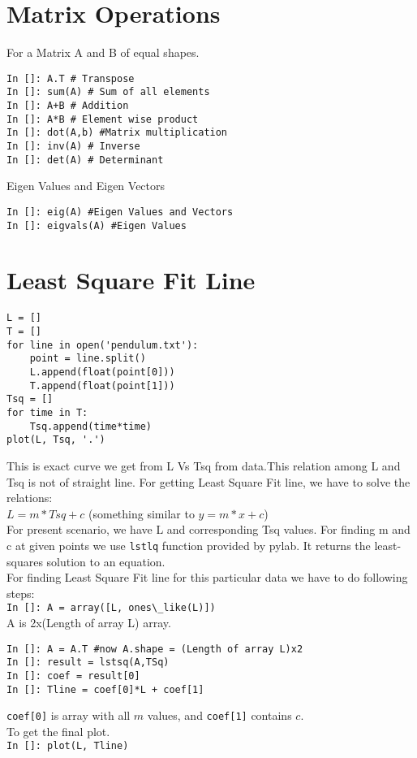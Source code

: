 \documentclass[12pt]{article}
\newcommand{\typ}[1]{\lstinline{#1}}
\begin{document}
\section{Matrix Operations}
For a Matrix A and B of equal shapes.
\begin{lstlisting}
In []: A.T # Transpose
In []: sum(A) # Sum of all elements
In []: A+B # Addition
In []: A*B # Element wise product
In []: dot(A,b) #Matrix multiplication
In []: inv(A) # Inverse
In []: det(A) # Determinant
\end{lstlisting}
Eigen Values and Eigen Vectors
\begin{lstlisting}
In []: eig(A) #Eigen Values and Vectors
In []: eigvals(A) #Eigen Values 
\end{lstlisting}
\section{Least Square Fit Line}
\begin{lstlisting}
L = []
T = []
for line in open('pendulum.txt'):
    point = line.split()
    L.append(float(point[0]))
    T.append(float(point[1]))
Tsq = []
for time in T:
    Tsq.append(time*time)
plot(L, Tsq, '.')
\end{lstlisting}
This is exact curve we get from L Vs Tsq from data.This relation among L and Tsq is not of straight line. For getting Least Square Fit line, we have to solve the relations:\\
$L=m*Tsq+c$ (something similar to $y=m*x+c$)\\
For present scenario, we have L and corresponding Tsq values. For finding m and c at given points we use \typ{lstlq} function provided by pylab. It returns the least-squares solution to an equation. \\
For finding Least Square Fit line for this particular data we have to do following steps:\\
\typ{In []: A = array([L, ones\_like(L)])}\\
A is 2x(Length of array L) array.
\begin{lstlisting}
In []: A = A.T #now A.shape = (Length of array L)x2
In []: result = lstsq(A,TSq)
In []: coef = result[0]
In []: Tline = coef[0]*L + coef[1]
\end{lstlisting}
\typ{coef[0]} is array with all $m$ values, and \typ{coef[1]} contains $c$.\\
To get the final plot.\\
\typ{In []: plot(L, Tline)}
\end{document}
